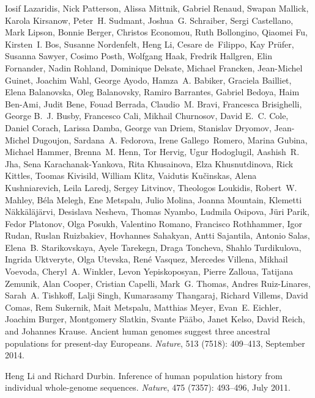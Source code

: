 \documentclass[10pt,letterpaper]{article}
\begin{document}
\begin{thebibliography}{80}
Iosif Lazaridis, Nick Patterson, Alissa Mittnik, Gabriel Renaud, Swapan
  Mallick, Karola Kirsanow, Peter~H. Sudmant, Joshua~G. Schraiber, Sergi
  Castellano, Mark Lipson, Bonnie Berger, Christos Economou, Ruth Bollongino,
  Qiaomei Fu, Kirsten~I. Bos, Susanne Nordenfelt, Heng Li, Cesare de~Filippo,
  Kay Prüfer, Susanna Sawyer, Cosimo Posth, Wolfgang Haak, Fredrik Hallgren,
  Elin Fornander, Nadin Rohland, Dominique Delsate, Michael Francken,
  Jean-Michel Guinet, Joachim Wahl, George Ayodo, Hamza~A. Babiker, Graciela
  Bailliet, Elena Balanovska, Oleg Balanovsky, Ramiro Barrantes, Gabriel
  Bedoya, Haim Ben-Ami, Judit Bene, Fouad Berrada, Claudio~M. Bravi, Francesca
  Brisighelli, George B.~J. Busby, Francesco Cali, Mikhail Churnosov, David
  E.~C. Cole, Daniel Corach, Larissa Damba, George van Driem, Stanislav
  Dryomov, Jean-Michel Dugoujon, Sardana~A. Fedorova, Irene Gallego~Romero,
  Marina Gubina, Michael Hammer, Brenna~M. Henn, Tor Hervig, Ugur Hodoglugil,
  Aashish~R. Jha, Sena Karachanak-Yankova, Rita Khusainova, Elza Khusnutdinova,
  Rick Kittles, Toomas Kivisild, William Klitz, Vaidutis Kučinskas, Alena
  Kushniarevich, Leila Laredj, Sergey Litvinov, Theologos Loukidis, Robert~W.
  Mahley, Béla Melegh, Ene Metspalu, Julio Molina, Joanna Mountain, Klemetti
  Näkkäläjärvi, Desislava Nesheva, Thomas Nyambo, Ludmila Osipova, Jüri
  Parik, Fedor Platonov, Olga Posukh, Valentino Romano, Francisco Rothhammer,
  Igor Rudan, Ruslan Ruizbakiev, Hovhannes Sahakyan, Antti Sajantila, Antonio
  Salas, Elena~B. Starikovskaya, Ayele Tarekegn, Draga Toncheva, Shahlo
  Turdikulova, Ingrida Uktveryte, Olga Utevska, René Vasquez, Mercedes
  Villena, Mikhail Voevoda, Cheryl~A. Winkler, Levon Yepiskoposyan, Pierre
  Zalloua, Tatijana Zemunik, Alan Cooper, Cristian Capelli, Mark~G. Thomas,
  Andres Ruiz-Linares, Sarah~A. Tishkoff, Lalji Singh, Kumarasamy Thangaraj,
  Richard Villems, David Comas, Rem Sukernik, Mait Metspalu, Matthias Meyer,
  Evan~E. Eichler, Joachim Burger, Montgomery Slatkin, Svante Pääbo, Janet
  Kelso, David Reich, and Johannes Krause.
\newblock Ancient human genomes suggest three ancestral populations for
  present-day {Europeans}.
\newblock \emph{Nature}, 513 (7518): 409--413, September
  2014.

Heng Li and Richard Durbin.
\newblock Inference of human population history from individual whole-genome
  sequences.
\newblock \emph{Nature}, 475 (7357): 493--496, July 2011.


\end{thebibliography}
\end{document}
